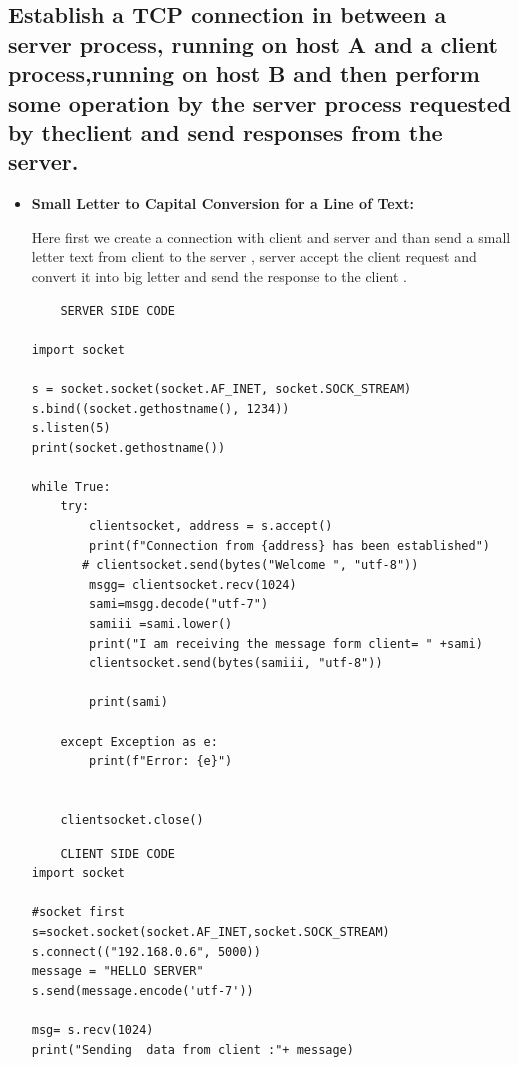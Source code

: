 \documentclass[11pt]{article}
\begin{document}
\subsection{Establish a TCP connection in between a server process, running on host A and a client process,running on host B and then perform some operation by the server process requested by theclient and send responses from the server.}


\begin{itemize}
    \item \textbf{Small Letter to Capital Conversion for a Line of Text:}
    
    Here first we create a connection with client and server and than send a small letter text from client to the server , server accept the client request and convert it into big letter and send the response to the client . 
    \begin{verbatim}
    SERVER SIDE CODE
   
import socket

s = socket.socket(socket.AF_INET, socket.SOCK_STREAM)
s.bind((socket.gethostname(), 1234))
s.listen(5)
print(socket.gethostname())

while True:
    try:
        clientsocket, address = s.accept()
        print(f"Connection from {address} has been established")
       # clientsocket.send(bytes("Welcome ", "utf-8"))
        msgg= clientsocket.recv(1024)
        sami=msgg.decode("utf-7")
        samiii =sami.lower()
        print("I am receiving the message form client= " +sami)
        clientsocket.send(bytes(samiii, "utf-8"))

        print(sami)
        
    except Exception as e:
        print(f"Error: {e}")


    clientsocket.close()
\end{verbatim}


    \begin{verbatim}
    CLIENT SIDE CODE
import socket

#socket first
s=socket.socket(socket.AF_INET,socket.SOCK_STREAM)
s.connect(("192.168.0.6", 5000))
message = "HELLO SERVER"
s.send(message.encode('utf-7'))

msg= s.recv(1024)
print("Sending  data from client :"+ message)


\end{verbatim}
\end{itemize}
\end{document}
